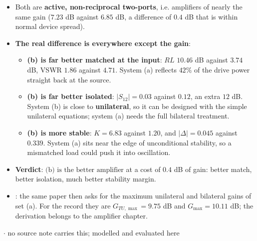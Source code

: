 \begin{itemize}
  \item Both are \textbf{active, non-reciprocal two-ports}, i.e. amplifiers of nearly the
    same gain ($7.23$ dB against $6.85$ dB, a difference of $0.4$ dB that is within normal
    device spread).
  \item \textbf{The real difference is everywhere except the gain}:
  \begin{itemize}
    \item \textbf{(b) is far better matched at the input}: $RL$ $10.46$ dB against
      $3.74$ dB, VSWR $1.86$ against $4.71$. System (a) reflects $42\%$ of the drive power
      straight back at the source.
    \item \textbf{(b) is far better isolated}: $|S_{12}| = 0.03$ against $0.12$, an extra
      $12$ dB. System (b) is close to \textbf{unilateral}, so it can be designed with the
      simple unilateral equations; system (a) needs the full bilateral treatment.
    \item \textbf{(b) is more stable}: $K = 6.83$ against $1.20$, and $|\Delta| = 0.045$
      against $0.339$. System (a) sits near the edge of unconditional stability, so a
      mismatched load could push it into oscillation.
  \end{itemize}
  \item \textbf{Verdict}: $\boxed{\text{(b) is the better amplifier}}$ at a cost of
    $0.4$ dB of gain: better match, better isolation, much better stability margin.
  \item {}: the same paper then asks for the maximum unilateral and
    bilateral gains of set (a). For the record they are $G_{TU,\max} = 9.75$ dB and
    $G_{\max} = 10.11$ dB; the derivation belongs to the amplifier chapter.
\end{itemize}

\vspace{2pt}

{\color{sub}\footnotesize {} \gap$\cdot$\gap \added{} no source note carries this; modelled and evaluated here}

